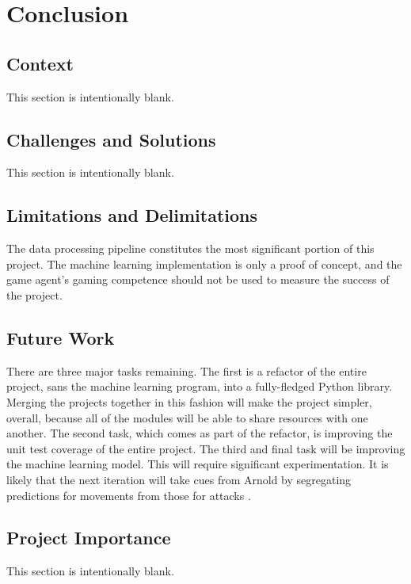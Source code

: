\chapter{Conclusion}


\section{Context}

This section is intentionally blank.



\section{Challenges and Solutions}

This section is intentionally blank.



\section{Limitations and Delimitations}

The data processing pipeline constitutes the most significant portion of this project. The machine learning implementation is only a proof of concept, and the game agent's gaming competence should not be used to measure the success of the project.



\section{Future Work}

There are three major tasks remaining. The first is a refactor of the entire project, sans the machine learning program, into a fully-fledged Python library. Merging the projects together in this fashion will make the project simpler, overall, because all of the modules will be able to share resources with one another. The second task, which comes as part of the refactor, is improving the unit test coverage of the entire project. The third and final task will be improving the machine learning model. This will require significant experimentation. It is likely that the next iteration will take cues from Arnold by segregating predictions for movements from those for attacks \cite{Chaplot}.


\section{Project Importance}

This section is intentionally blank.

